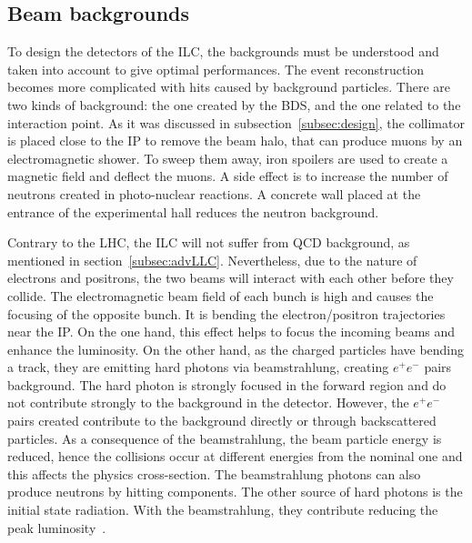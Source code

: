     \subsection{Beam backgrounds}

    To design the detectors of the \gls{ILC}, the backgrounds must be understood and taken into account to give optimal performances.
    The event reconstruction becomes more complicated with hits caused by background particles.
    There are two kinds of background: the one created by the \gls{BDS}, and the one related to the interaction point.
    As it was discussed in subsection~\ref{subsec:design}, the collimator is placed close to the \gls{IP} to remove the beam halo, that can produce muons by an electromagnetic shower.
    To sweep them away, iron spoilers are used to create a magnetic field and deflect the muons.
    A side effect is to increase the number of neutrons created in photo-nuclear reactions.
    A concrete wall placed at the entrance of the experimental hall reduces the neutron background.

    Contrary to the \gls{LHC}, the \gls{ILC} will not suffer from QCD background, as mentioned in section~\ref{subsec:advLLC}.
    Nevertheless, due to the nature of electrons and positrons, the two beams will interact with each other before they collide.
    The electromagnetic beam field of each bunch is high and causes the focusing of the opposite bunch.
    It is bending the electron/positron trajectories near the \gls{IP}.
    On the one hand, this effect helps to focus the incoming beams and enhance the luminosity.
    On the other hand, as the charged particles have bending a track, they are emitting hard photons via beamstrahlung, creating $e^+e^-$ pairs background.
    The hard photon is strongly focused in the forward region and do not contribute strongly to the background in the detector.
    However, the $e^+e^-$ pairs created contribute to the background directly or through backscattered particles.
    As a consequence of the beamstrahlung, the beam particle energy is reduced, hence the collisions occur at different energies from the nominal one and this affects the physics cross-section.
    The beamstrahlung photons can also produce neutrons by hitting components.
    The other source of hard photons is the initial state radiation. 
    With the beamstrahlung, they contribute reducing the peak luminosity~\cite{Markin2014}.

